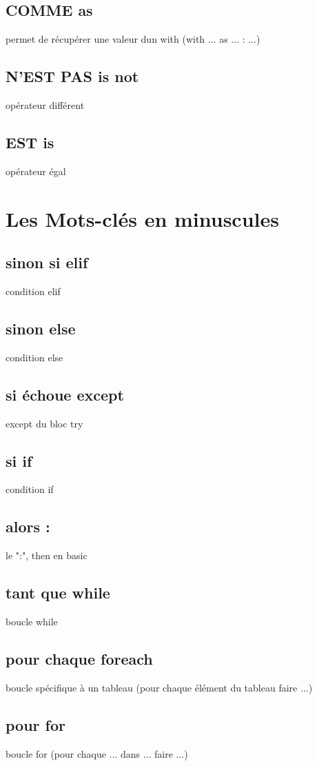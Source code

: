 \documentclass{book}
\begin{document}
\section{COMME as }
  permet de récupérer une valeur dun with (with ... as ... : ...)
\section{N'EST PAS is not }
  opérateur différent 
\section{EST is }
  opérateur égal

\chapter{Les Mots-clés en minuscules}

\section{sinon si elif }
  condition elif
\section{sinon else }
  condition else
\section{si échoue except }
  except du bloc try
\section{si if }
  condition if
\section{alors : }
  le ":", then en basic
\section{tant que while }
  boucle while
\section{pour chaque foreach }
  boucle spécifique à un tableau (pour chaque élément du tableau faire ...)
\section{pour for }
  boucle for (pour chaque ... dans ... faire ...) 
\end{document}
